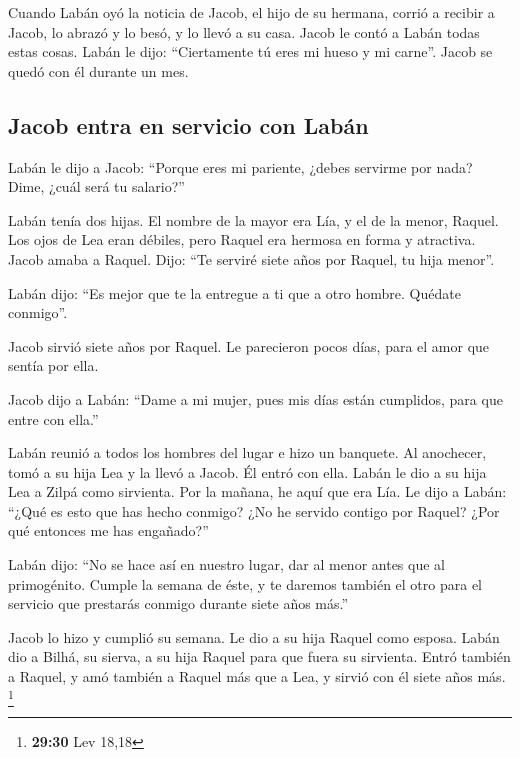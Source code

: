 \begin{paracol}{2}
 Cuando Labán oyó la noticia de Jacob, el hijo de su
hermana, corrió a recibir a Jacob, lo abrazó y lo besó, y lo llevó a su
casa. Jacob le contó a Labán todas estas cosas.  Labán le
dijo: ``Ciertamente tú eres mi hueso y mi carne''. Jacob se quedó con él
durante un mes.

\hypertarget{jacob-entra-en-servicio-con-labuxe1n}{%
\subsection{Jacob entra en servicio con
Labán}\label{jacob-entra-en-servicio-con-labuxe1n}}

 Labán le dijo a Jacob: ``Porque eres mi pariente, ¿debes
servirme por nada? Dime, ¿cuál será tu salario?''

 Labán tenía dos hijas. El nombre de la mayor era Lía, y
el de la menor, Raquel.  Los ojos de Lea eran débiles,
pero Raquel era hermosa en forma y atractiva.  Jacob
amaba a Raquel. Dijo: ``Te serviré siete años por Raquel, tu hija
menor''.

 Labán dijo: ``Es mejor que te la entregue a ti que a
otro hombre. Quédate conmigo''.

 Jacob sirvió siete años por Raquel. Le parecieron pocos
días, para el amor que sentía por ella.

 Jacob dijo a Labán: ``Dame a mi mujer, pues mis días
están cumplidos, para que entre con ella.''

 Labán reunió a todos los hombres del lugar e hizo un
banquete.  Al anochecer, tomó a su hija Lea y la llevó a
Jacob. Él entró con ella.  Labán le dio a su hija Lea a
Zilpá como sirvienta.  Por la mañana, he aquí que era
Lía. Le dijo a Labán: ``¿Qué es esto que has hecho conmigo? ¿No he
servido contigo por Raquel? ¿Por qué entonces me has engañado?''

 Labán dijo: ``No se hace así en nuestro lugar, dar al
menor antes que al primogénito.  Cumple la semana de
éste, y te daremos también el otro para el servicio que prestarás
conmigo durante siete años más.''

 Jacob lo hizo y cumplió su semana. Le dio a su hija
Raquel como esposa.  Labán dio a Bilhá, su sierva, a su
hija Raquel para que fuera su sirvienta.  Entró también a
Raquel, y amó también a Raquel más que a Lea, y sirvió con él siete años
más. \footnote{\textbf{29:30} Lev 18,18}


\end{paracol}

